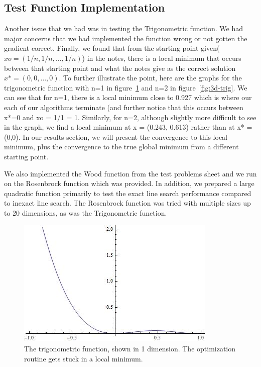 \documentclass[12pt]{amsart}
\begin{document}
\subsection{Test Function Implementation}

Another issue that we had was in testing the Trigonometric function.  We had major concerns that we had implemented the function wrong or not gotten the gradient correct.  Finally, we found that from the starting point given($xo = (1/n, 1/n,\hdots,1/n)$) in the notes, there is a local minimum that occurs between that starting point and what the notes give as the correct solution $x* = (0,0,\hdots,0)$.  To further illustrate the point, here are the graphs for the trigonometric function with n=1 in figure~\ref{fig:2d-trig} and n=2 in figure~\ref{fig:3d-trig}.  We can see that for n=1, there is a local minimum close to 0.927 which is where our each of our algorithms terminate (and further notice that this occurs between x*=0 and xo = 1/1 = 1. Similarly, for n=2, although slightly more difficult to see in the graph, we find a local minimum at x = (0.243, 0.613) rather than at x* = (0,0).  In our results section, we will present the convergence to this local minimum, plus the convergence to the true global minimum from a different starting point.

We also implemented the Wood function from the test problems sheet and we run on the Rosenbrock function which was provided.  In addition, we prepared a large quadratic function primarily to test the exact line search performance compared to inexact line search.  The Rosenbrock function was tried with multiple sizes up to 20 dimensions, as was the Trigonometric function.

\begin{figure}[thpb]
\centering
\includegraphics[scale=0.60]{images/2dtrig.jpg}
\caption{The trigonometric function, shown in 1 dimension.  The optimization routine gets stuck in a local minimum.}
\label{fig:2d-trig}
\end{figure}
\end{document}
